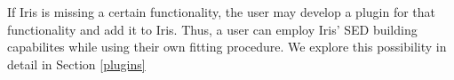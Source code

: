 If Iris is missing a certain functionality, the user may develop a plugin for that functionality and add it to Iris. Thus, a user can employ Iris' SED building capabilites while using their own fitting procedure. We explore this possibility in detail in Section \ref{plugins}

\begin{comment}
Following the VO effort for seamless interoperability between data services and applications,  

The Virtual Observatory is an effort to standardize data formats and services so that users can seamlessly exchange data back and forth between archives and applications.  

Iris offers a standard means of building large broadband SEDs from different sources in various data formats, while providing robust fitting methods and interactive visualization capabilities.
\end{comment}